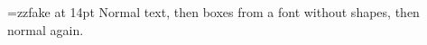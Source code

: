 \documentclass{article}
\begin{document}
\font\zz=zzfake at 14pt
Normal text, then {\zz boxes from a font without shapes}, then normal again.
\end{document}

